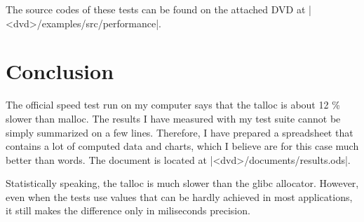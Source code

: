 \noindent
The source codes of these tests can be found on the attached DVD at
|<dvd>/examples/src/performance|.

\section{Conclusion}

The official speed test run on my computer says that the talloc is about 12 \%
slower than malloc. The results I have measured with my test suite cannot be
simply summarized on a few lines. Therefore, I have prepared a spreadsheet that
contains a lot of computed data and charts, which I believe are for this
case much better than words. The document is located at
|<dvd>/documents/results.ods|.

Statistically speaking, the talloc is much slower than the glibc allocator.
However, even when the tests use values that can be hardly achieved in most
applications, it still makes the difference only in miliseconds precision.
 